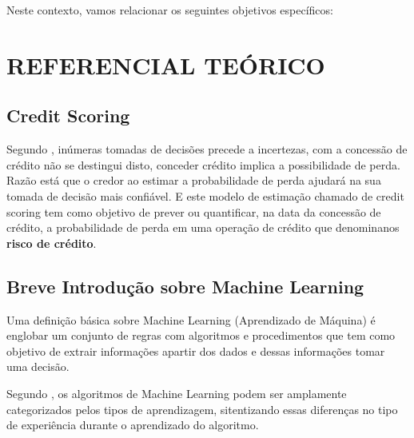 \documentclass[
	12pt,				%
	openright,			%
	oneside,      %
	a4paper,			%
	english,			%
	french,				%
	spanish,			%
	brazil,				%
	]{abntex2}\usepackage[]{graphicx}\usepackage[table]{xcolor}
\theoremstyle{definition}
\begin{document}
Neste contexto, vamos relacionar os seguintes objetivos específicos:






\chapter{REFERENCIAL TEÓRICO}


  \section{Credit Scoring}
  
Segundo \cite{sicsu2010credit}, inúmeras tomadas de decisões precede a incertezas, com a concessão de crédito não se destingui disto, conceder crédito implica a possibilidade de perda. Razão está que o 
credor ao estimar a probabilidade de perda ajudará na sua tomada de decisão mais confiável. E este modelo de estimação chamado de credit scoring tem como objetivo de prever ou quantificar, na data da concessão de crédito, a probabilidade de perda em uma operação de crédito que denominanos \textbf{risco de crédito}. 
  
  
  
  
  \section{Breve Introdução sobre Machine Learning}
  
Uma definição básica sobre Machine Learning (Aprendizado de Máquina) é englobar 
um conjunto de regras com algoritmos e procedimentos que tem como objetivo de 
extrair informações apartir dos dados e dessas informações tomar uma decisão.

Segundo \cite{goodfellow2016deep}, os algoritmos de Machine Learning podem ser 
amplamente categorizados pelos tipos de aprendizagem, sitentizando essas diferenças
no tipo de experiência durante o aprendizado do algoritmo.
\end{document}
